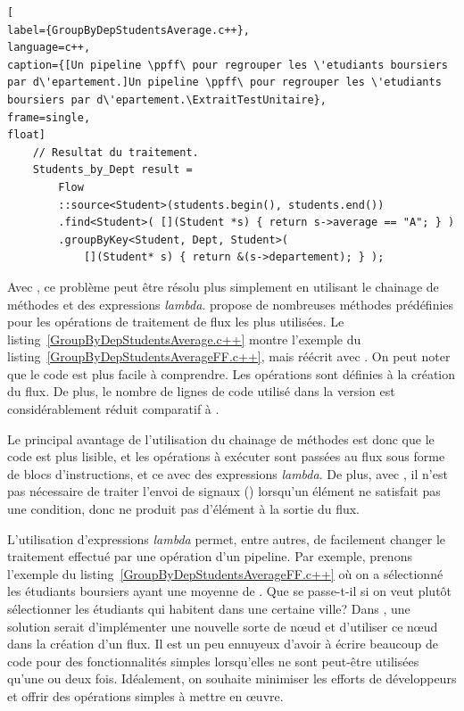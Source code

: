 \begin{lstlisting}[
label={GroupByDepStudentsAverage.c++},
language=c++,
caption={[Un pipeline \ppff\ pour regrouper les \'etudiants boursiers par d\'epartement.]Un pipeline \ppff\ pour regrouper les \'etudiants boursiers par d\'epartement.\ExtraitTestUnitaire},
frame=single,
float]
    // Resultat du traitement.
    Students_by_Dept result = 
        Flow
        ::source<Student>(students.begin(), students.end())
        .find<Student>( [](Student *s) { return s->average == "A"; } )
        .groupByKey<Student, Dept, Student>(
            [](Student* s) { return &(s->departement); } );        
\end{lstlisting}

Avec , ce probl\`eme peut \^etre r\'esolu plus simplement en utilisant le chainage de m\'ethodes et des expressions \emph{lambda}.  propose de nombreuses m\'ethodes pr\'ed\'efinies pour les op\'erations de traitement de flux les plus utilis\'ees. Le listing~\ref{GroupByDepStudentsAverage.c++} montre l'exemple du listing~\ref{GroupByDepStudentsAverageFF.c++}, mais r\'e\'ecrit avec . On peut noter que le code est plus facile \`a comprendre. Les op\'erations sont définies \`a la cr\'eation du flux. De plus, le nombre de lignes de code utilis\'e dans la version  est consid\'erablement r\'eduit comparatif \`a . 

Le principal avantage de l'utilisation du chainage de m\'ethodes est donc que le code est plus lisible, et les op\'erations à exécuter sont pass\'ees au flux sous forme de blocs d'instructions, et ce avec des expressions \emph{lambda}.
%
De plus, avec , il n'est pas nécessaire de traiter l'envoi de
signaux () lorsqu'un élément ne satisfait pas une
condition, donc ne produit pas d'élément à la sortie du flux.




L'utilisation d'expressions \emph{lambda} permet, entre autres, de
facilement changer le traitement effectué par une opération d'un
pipeline.
%
Par exemple, prenons l'exemple du listing~\ref{GroupByDepStudentsAverageFF.c++} o\`u on a sélectionné les \'etudiants boursiers ayant une moyenne de . Que se passe-t-il si on veut plutôt sélectionner les \'etudiants qui habitent dans une certaine ville? Dans , une solution serait d'impl\'ementer une nouvelle sorte de nœud et d'utiliser ce n\oe{}ud dans la cr\'eation d'un flux. 
%
Il est un peu ennuyeux d'avoir \`a \'ecrire beaucoup de code pour des fonctionnalit\'es simples lorsqu'elles ne sont peut-\^etre utilis\'ees qu'une ou deux fois. Id\'ealement, on souhaite minimiser les efforts de d\'eveloppeurs et offrir des op\'erations simples \`a mettre en œuvre.


